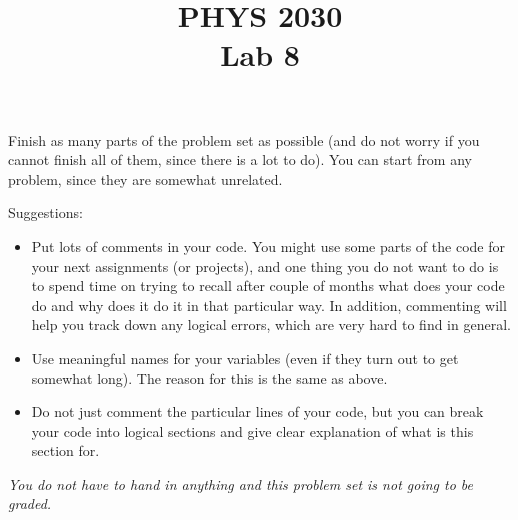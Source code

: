 \documentclass[letterpaper]{article}
\title{PHYS 2030 \\Lab 8}
\begin{document}
\maketitle
Finish as many parts of the problem set as possible (and do not worry if you cannot finish all of them, since there is a lot to do). You can start from any problem, since they are somewhat unrelated.

Suggestions: 
\begin{itemize}
\item Put lots of comments in your code. You might use some parts of the code for your next assignments (or projects), and one thing you do not want to do is to spend time on trying to recall after couple of months what does your code do and why does it do it in that particular way. In addition, commenting will help you track down any logical errors, which are very hard to find in general.
\item  Use meaningful names for your variables (even if they turn out to get somewhat long). The reason for this is the same as above.
\item Do not just comment the particular lines of your code, but you can break your code into logical sections and give clear explanation of what is this section for.
\end{itemize}

\emph{You do not have to hand in anything and this problem set is not going to be graded.} 
\end{document}
